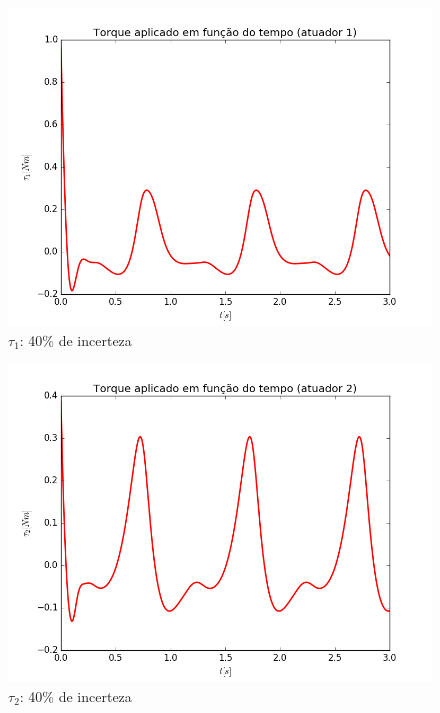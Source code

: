\documentclass[]{politex}
\begin{document}
\begin{multicols}{2}
\begin{figure}[H]
	\centering
	\includegraphics[scale=0.40]{imagens/tau1_40.png}  
	\caption{$\tau_1$: 40\% de incerteza}
	\label{fig:Torque1_40}
\end{figure}
\begin{figure}[H]
	\centering
	\includegraphics[scale=0.40]{imagens/tau2_40.png}  
	\caption{$\tau_2$: 40\% de incerteza}
	\label{fig:Torque2_40}
\end{figure}
\end{multicols}  

\newpage
\end{document}
